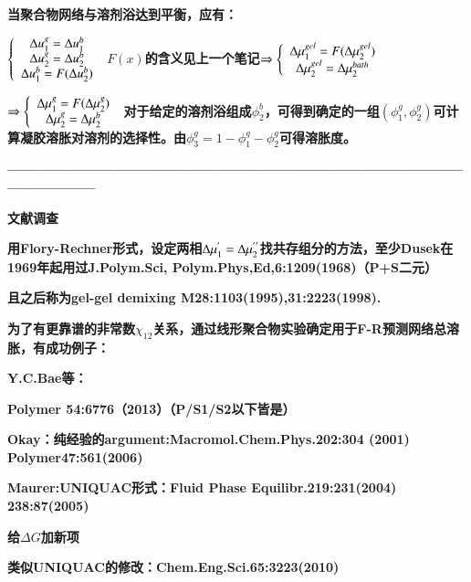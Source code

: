 \documentclass{article} %
\begin{document}
{\bf  当聚合物网络与溶剂浴达到平衡，应有：}

\noindent 
{\bf $\left\{\begin{array}{c} {{\rm \Delta }u_{1}^{g} ={\rm \Delta }u_{1}^{b} } \\ {{\rm \Delta }u_{2}^{g} ={\rm \Delta }u_{2}^{b} } \\ {{\rm \Delta }u_{1}^{b} =F({\rm \Delta }u_{2}^{b} )} \end{array}\right. $ $F(x)$的含义见上一个笔记$\Rightarrow \left\{\begin{array}{c} {{\rm \Delta }\mu _{1}^{gel} =F({\rm \Delta }\mu _{2}^{gel} )} \\ {{\rm \Delta }\mu _{2}^{gel} ={\rm \Delta }\mu _{2}^{bath} } \end{array}\right. $ }

\noindent 
{\bf $\Rightarrow \left\{\begin{array}{c} {{\rm \Delta }\mu _{1}^{g} =F({\rm \Delta }\mu _{2}^{g} )} \\ {{\rm \Delta }\mu _{2}^{g} ={\rm \Delta }\mu _{2}^{b} } \end{array}\right. $ 对于给定的溶剂浴组成$\phi _{2}^{b} $，可得到确定的一组$(\phi _{1}^{g} ,\phi _{2}^{g} )$可计算凝胶溶胀对溶剂的选择性。由$\phi _{3}^{g} =1-\phi _{1}^{g} -\phi _{2}^{g} $可得溶胀度。}

\noindent 
{\bf ---------------------------------------------------------------------------------------------------------------}


{\bf  文献调查}


{\bf  用Flory-Rechner形式，设定两相${\rm \Delta }\mu _{1}^{{'} } ={\rm \Delta }\mu _{2}^{{'} {'} } $找共存组分的方法，至少Dusek在1969年起用过J.Polym.Sci, Polym.Phys,Ed,6:1209(1968)（P+S二元）}

\noindent 
{\bf 且之后称为gel-gel demixing M28:1103(1995),31:2223(1998).}


{\bf  为了有更靠谱的非常数$\chi _{12} $关系，通过线形聚合物实验确定用于F-R预测网络总溶胀，有成功例子：}

\noindent 
{\bf Y.C.Bae等：}

\noindent 
{\bf Polymer 54:6776（2013）（P/S1/S2以下皆是）}

\noindent 
{\bf Okay：纯经验的argument:Macromol.Chem.Phys.202:304 (2001) Polymer47:561(2006)}

\noindent 
{\bf Maurer:UNIQUAC形式：Fluid Phase Equilibr.219:231(2004) 238:87(2005)}


{\bf  给$\Delta G$加新项}

\noindent 
{\bf 类似UNIQUAC的修改：Chem.Eng.Sci.65:3223(2010)}
\end{document}
